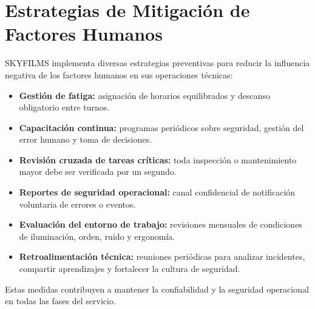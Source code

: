 \section{Estrategias de Mitigación de Factores Humanos}
SKYFILMS implementa diversas estrategias preventivas para reducir la influencia negativa de los factores humanos en sus operaciones técnicas:

\begin{itemize}
    \item \textbf{Gestión de fatiga:} asignación de horarios equilibrados y descanso obligatorio entre turnos.

    \item \textbf{Capacitación continua:} programas periódicos sobre seguridad, gestión del error humano y toma de decisiones.

    \item \textbf{Revisión cruzada de tareas críticas:} toda inspección o mantenimiento mayor debe ser verificada por un segundo.

    \item \textbf{Reportes de seguridad operacional:} canal confidencial de notificación voluntaria de errores o eventos.

    \item \textbf{Evaluación del entorno de trabajo:} revisiones mensuales de condiciones de iluminación, orden, ruido y ergonomía.

    \item \textbf{Retroalimentación técnica:} reuniones periódicas para analizar incidentes, compartir aprendizajes y fortalecer la cultura de seguridad.
\end{itemize}

Estas medidas contribuyen a mantener la confiabilidad y la seguridad operacional en todas las fases del servicio.

